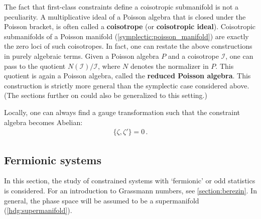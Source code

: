    \begin{remark}
        The fact that first-class constraints define a coisotropic submanifold is not a peculiarity. A multiplicative ideal of a Poisson algebra that is closed under the Poisson bracket, is often called a \textbf{coisotrope} (or \textbf{coisotropic ideal}). Coisotropic submanifolds of a Poisson manifold  (\cref{symplectic:poisson_manifold}) are exactly the zero loci of such coisotropes. In fact, one can restate the above constructions in purely algebraic terms. Given a Poisson algebra $P$ and a coisotrope $\mathcal{I}$, one can pass to the quotient $N(\mathcal{I})/\mathcal{I}$, where $N$ denotes the normalizer in $P$. This quotient is again a Poisson algebra, called the \textbf{reduced Poisson algebra}. This construction is strictly more general than the symplectic case considered above. (The sections further on could also be generalized to this setting.)
    \end{remark}

    \begin{theorem}[Abelianization]
        Locally, one can always find a gauge transformation such that the constraint algebra becomes Abelian:
        \begin{gather}
            \{\zeta,\zeta'\}=0\,.
        \end{gather}
    \end{theorem}

\subsection{Fermionic systems}

    In this section, the study of constrained systems with `fermionic' or odd statistics is considered. For an introduction to Grassmann numbers, see \cref{section:berezin}. In general, the phase space will be assumed to be a supermanifold (\cref{hdg:supermanifold}).

